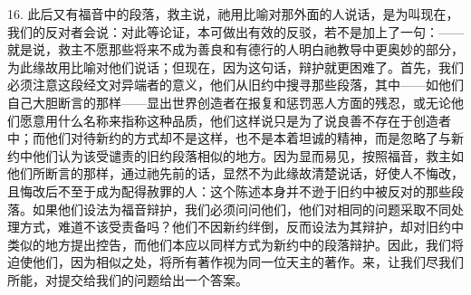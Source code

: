 16. 此后又有福音中的段落，救主说，祂用比喻对那外面的人说话，是为叫现在，我们的反对者会说：对此等论证，本可做出有效的反驳，若不是加上了一句：——就是说，救主不愿那些将来不成为善良和有德行的人明白祂教导中更奥妙的部分，为此缘故用比喻对他们说话；但现在，因为这句话，辩护就更困难了。首先，我们必须注意这段经文对异端者的意义，他们从旧约中搜寻那些段落，其中——如他们自己大胆断言的那样——显出世界创造者在报复和惩罚恶人方面的残忍，或无论他们愿意用什么名称来指称这种品质，他们这样说只是为了说良善不存在于创造者中；而他们对待新约的方式却不是这样，也不是本着坦诚的精神，而是忽略了与新约中他们认为该受谴责的旧约段落相似的地方。因为显而易见，按照福音，救主如他们所断言的那样，通过祂先前的话，显然不为此缘故清楚说话，好使人不悔改，且悔改后不至于成为配得赦罪的人：这个陈述本身并不逊于旧约中被反对的那些段落。如果他们设法为福音辩护，我们必须问问他们，他们对相同的问题采取不同处理方式，难道不该受责备吗？他们不因新约绊倒，反而设法为其辩护，却对旧约中类似的地方提出控告，而他们本应以同样方式为新约中的段落辩护。因此，我们将迫使他们，因为相似之处，将所有著作视为同一位天主的著作。来，让我们尽我们所能，对提交给我们的问题给出一个答案。\par

